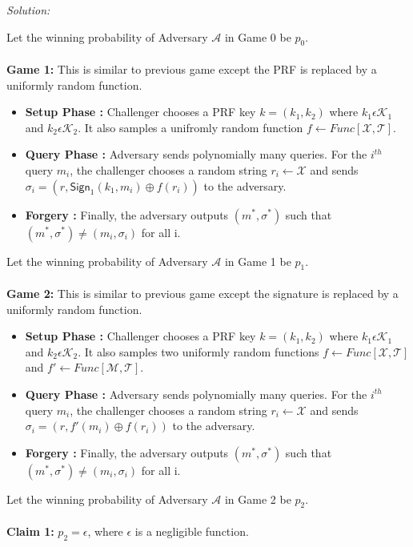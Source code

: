 \documentclass[a4paper, 11pt]{article}
\newenvironment{solution}
    {\textit{Solution:}}
    {\clearpage}
\newcommand{\sign}{\mathsf{Sign}}
\newcommand{\calA}{\mathcal{A}}
\newcommand{\calK}{\mathcal{K}}
\newcommand{\calM}{\mathcal{M}}
\newcommand{\calX}{\mathcal{X}}
\newcommand{\calT}{\mathcal{T}}
\begin{document}
\begin{solution}
\begin{enumerate}[(a)]
              Let the winning probability of Adversary $\calA$ in Game 0 be $p_0$. \\ \\
              \textbf{Game 1:} This is similar to previous game except the PRF is replaced by a uniformly random function.
              \begin{itemize}
                  \item \textbf{Setup Phase :} Challenger chooses a PRF key $k = (k_1, k_2)$ where $k_1 \epsilon \calK_1$ and $k_2 \epsilon \calK_2$. It also samples a unifromly random function $f \leftarrow Func[\calX, \calT]$.
                  \item \textbf{Query Phase :} Adversary sends polynomially many queries. For the $i^{th}$ query $m_i$, the challenger chooses a random string $r_i \leftarrow \calX$ and sends $\sigma_i = (r, \sign_1(k_1, m_i) \oplus f(r_i))$ to the adversary.
                  \item \textbf{Forgery :} Finally, the adversary outputs $(m^*, \sigma^*)$ such that $(m^*, \sigma^*) \neq (m_i, \sigma_i)$ for all i.
              \end{itemize}
              Let the winning probability of Adversary $\calA$ in Game 1 be $p_1$. \\ \\
              \textbf{Game 2:} This is similar to previous game except the signature is replaced by a uniformly random function.
              \begin{itemize}
                  \item \textbf{Setup Phase :} Challenger chooses a PRF key $k = (k_1, k_2)$ where $k_1 \epsilon \calK_1$ and $k_2 \epsilon \calK_2$. It also samples two uniformly random functions $f \leftarrow Func[\calX, \calT]$ and $f' \leftarrow Func[\calM, \calT]$.
                  \item \textbf{Query Phase :} Adversary sends polynomially many queries. For the $i^{th}$ query $m_i$, the challenger chooses a random string $r_i \leftarrow \calX$ and sends $\sigma_i = (r, f'(m_i) \oplus f(r_i))$ to the adversary.
                  \item \textbf{Forgery :} Finally, the adversary outputs $(m^*, \sigma^*)$ such that $(m^*, \sigma^*) \neq (m_i, \sigma_i)$ for all i.
              \end{itemize}
              Let the winning probability of Adversary $\calA$ in Game 2 be $p_2$. \\ \\
              \textbf{Claim 1:} $p_2 = \epsilon$, where $\epsilon$ is a negligible function. \\

\end{enumerate}
\end{solution}
\end{document}

